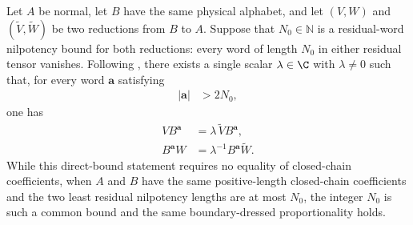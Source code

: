 \begin{lemma}
    \label{thm:mps_reduction_boundary_dressed_uniqueness}
    \leanok
    Let $A$ be normal, let $B$ have the same physical alphabet, and let
    $(V,W)$ and $(\widetilde V,\widetilde W)$ be two reductions from $B$ to
    $A$.  Suppose that $N_0\in\mathbb N$ is a residual-word nilpotency bound
    for both reductions: every word of length $N_0$ in either residual tensor
    vanishes.  Following \cite[Theorem~22]{Molnar2018SemiInjective}, there
    exists a single scalar $\lambda\in\C$ with $\lambda\ne0$ such that, for
    every word $\mathbf a$ satisfying
    \begin{align}
        |\mathbf a| & > 2N_0,
        \label{eq:mps_reduction_boundary_dressed_length}
    \end{align}
    one has
    \begin{align}
        VB^{\mathbf a}
         & =\lambda\,\widetilde V B^{\mathbf a},
        \label{eq:mps_reduction_boundary_dressed_left} \\
        B^{\mathbf a}W
         & =\lambda^{-1}B^{\mathbf a}\widetilde W.
        \label{eq:mps_reduction_boundary_dressed_right}
    \end{align}
    While this direct-bound statement requires no equality of closed-chain
    coefficients, when $A$ and $B$ have the same positive-length closed-chain
    coefficients and the two least residual nilpotency lengths are at most
    $N_0$, the integer $N_0$ is such a common bound and the same boundary-dressed
    proportionality holds.
\end{lemma}

